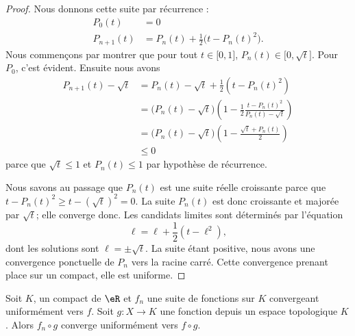 \begin{proof}
    Nous donnons cette suite par récurrence :
    \begin{subequations}
        \begin{align}
            P_0(t)&=0\\
            P_{n+1}(t)&=P_n(t)+\frac{ 1 }{2}\big( t-P_n(t)^2 \big).
        \end{align}
    \end{subequations}
    Nous commençons par montrer que pour tout \( t\in \mathopen[ 0 , 1 \mathclose]\), \( P_n(t)\in\mathopen[ 0 , \sqrt{t} \mathclose]\). Pour \( P_0\), c'est évident. Ensuite nous avons
    \begin{subequations}
        \begin{align}
            P_{n+1}(t)-\sqrt{t}&=P_n(t)-\sqrt{t}+\frac{ 1 }{2}(t-P_n(t)^2)\\
            &=\big( P_n(t)-\sqrt{t} \big)\left( 1-\frac{ 1 }{2}\frac{ t-P_n(t)^2 }{ P_n(t)-\sqrt{t} } \right)\\
            &=\big( P_n(t)-\sqrt{t} \big)\left( 1-\frac{ \sqrt{t}+P_n(t) }{2} \right)\\
            &\leq 0
        \end{align}
    \end{subequations}
    parce que \( \sqrt{t} \leq 1\) et \( P_n(t)\leq 1\) par hypothèse de récurrence.

    Nous savons au passage que \( P_n(t)\) est une suite réelle croissante parce que \( t-P_n(t)^2\geq t-(\sqrt{t})^2=0\). La suite \( P_n(t)\) est donc croissante et majorée par \( \sqrt{t}\); elle converge donc. Les candidats limites sont déterminés par l'équation
    \begin{equation}
        \ell=\ell+\frac{ 1 }{2}(t-\ell^2),
    \end{equation}
    dont les solutions sont \( \ell=\pm\sqrt{t}\). La suite étant positive, nous avons une convergence ponctuelle de \( P_n\) vers la racine carré. Cette convergence prenant place sur un compact, elle est uniforme.
\end{proof}

\begin{lemma}           \label{LemUuxcqY}
    Soit \( K\), un compact de \( \eR\) et \( f_n\) une suite de fonctions sur \( K\) convergeant uniformément vers \( f\). Soit \( g\colon X\to K\) une fonction depuis un espace topologique \( K\). Alors \( f_n\circ g\) converge uniformément vers \( f\circ g\).
\end{lemma}

